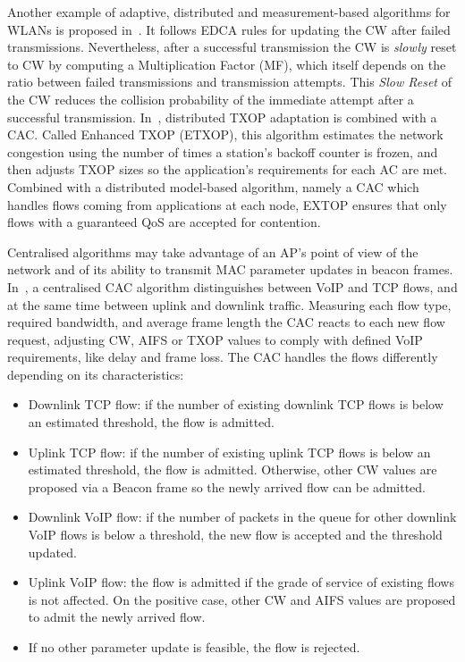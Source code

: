 \documentclass[a4paper]{article}
\begin{document}
Another example of adaptive, distributed and measurement-based algorithms for WLANs is proposed in~\cite{1200574}. It follows EDCA rules for updating the CW after failed transmissions. Nevertheless, after a successful transmission the CW is \emph{slowly} reset to CW by computing a Multiplication Factor (MF), which itself depends on the ratio between failed transmissions and transmission attempts. This \emph{Slow Reset} of the CW reduces the collision probability of the immediate attempt after a successful transmission. In~\cite{Ksentini}, distributed TXOP adaptation is combined with a CAC. Called Enhanced TXOP (ETXOP), this algorithm estimates the network congestion using the number of times a station's backoff counter is frozen, and then adjusts TXOP sizes so the application's requirements for each AC are met. Combined with a distributed model-based algorithm, namely a CAC which handles flows coming from applications at each node, EXTOP ensures that only flows with a guaranteed QoS are accepted for contention.

Centralised algorithms may take advantage of an AP's point of view of the network and of its ability to transmit MAC parameter updates in beacon frames. In~\cite{bellalta290call}, a centralised CAC algorithm distinguishes between VoIP and TCP flows, and at the same time between uplink and downlink traffic. Measuring each flow type, required bandwidth, and average frame length the CAC reacts to each new flow request, adjusting CW, AIFS or TXOP values to comply with defined VoIP requirements, like delay and frame loss. The CAC handles the flows differently depending on its characteristics:
	\begin{itemize}
		\item Downlink TCP flow: if the number of existing downlink TCP flows is below an estimated threshold, the flow is admitted.
		\item Uplink TCP flow: if the number of existing uplink TCP flows is below an estimated threshold, the flow is admitted. Otherwise, other CW values are proposed via a Beacon frame so the newly arrived flow can be admitted.
		\item Downlink VoIP flow: if the number of packets in the queue for other downlink VoIP flows is below a threshold, the new flow is accepted and the threshold updated.
		\item Uplink VoIP flow: the flow is admitted if the grade of service of existing flows is not affected. On the positive case, other CW and AIFS values are proposed to admit the newly arrived flow.
		\item If no other parameter update is feasible, the flow is rejected.
	\end{itemize}
\end{document}
